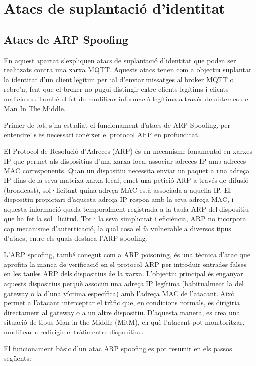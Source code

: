 \section{Atacs de suplantació d'identitat}
\subsection{Atacs de ARP Spoofing}
\label{sec:spoofing}
En aquest apartat s'expliquen atacs de suplantació d'identitat que poden ser realitzats contra una xarxa MQTT. Aquests atacs tenen com a objectiu suplantar la identitat d'un client legítim per tal d'enviar missatges al broker MQTT o rebre'n, fent que el broker no pugui distingir entre clients legítims i clients maliciosos. També el fet de modificar informació legítima a través de sistemes de Man In The Middle. 

Primer de tot, s'ha estudiat el funcionament d'atacs de ARP Spoofing, per entendre'ls és necessari conèixer el protocol ARP en profunditat.

El Protocol de Resolució d'Adreces (ARP) és un mecanisme fonamental en xarxes IP que permet als dispositius d'una xarxa local associar adreces IP amb adreces MAC corresponents. Quan un dispositiu necessita enviar un paquet a una adreça IP dins de la seva mateixa xarxa local, emet una petició ARP a través de difusió (broadcast), sol·licitant quina adreça MAC està associada a aquella IP. El dispositiu propietari d’aquesta adreça IP respon amb la seva adreça MAC, i aquesta informació queda temporalment registrada a la taula ARP del dispositiu que ha fet la sol·licitud. Tot i la seva simplicitat i eficiència, ARP no incorpora cap mecanisme d'autenticació, la qual cosa el fa vulnerable a diversos tipus d’atacs, entre els quals destaca l’ARP spoofing.

L’ARP spoofing, també conegut com a ARP poisoning, és una tècnica d’atac que aprofita la manca de verificació en el protocol ARP per introduir entrades falses en les taules ARP dels dispositius de la xarxa. L’objectiu principal és enganyar aquests dispositius perquè associïn una adreça IP legítima (habitualment la del gateway o la d’una víctima específica) amb l’adreça MAC de l’atacant. Això permet a l’atacant interceptar el tràfic que, en condicions normals, es dirigiria directament al gateway o a un altre dispositiu. D’aquesta manera, es crea una situació de tipus Man-in-the-Middle (MitM), en què l’atacant pot monitoritzar, modificar o redirigir el tràfic entre dispositius.


El funcionament bàsic d’un atac ARP spoofing es pot resumir en els passos següents:


